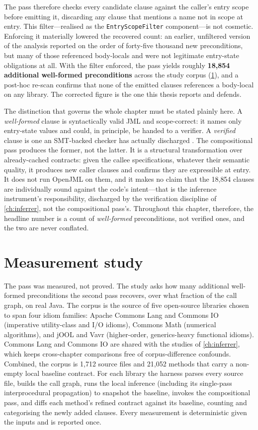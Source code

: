 The pass therefore checks every candidate clause against the caller's entry scope
before emitting it, discarding any clause that mentions a name not in scope at
entry. This filter---realised as the \texttt{EntryScopeFilter} component---is not
cosmetic. Enforcing it materially lowered the recovered count: an earlier,
unfiltered version of the analysis reported on the order of forty-five thousand
new preconditions, but many of those referenced body-locals and were not
legitimate entry-state obligations at all. With the filter enforced, the pass
yields roughly \textbf{18{,}854 additional well-formed preconditions} across the
study corpus (\cref{sec:comp-measurement}), and a post-hoc re-scan confirms that
none of the emitted clauses references a body-local on any library. The corrected
figure is the one this thesis reports and defends.

The distinction that governs the whole chapter must be stated plainly here. A
\emph{well-formed} clause is syntactically valid JML and scope-correct: it names
only entry-state values and could, in principle, be handed to a verifier. A
\emph{verified} clause is one an SMT-backed checker has actually discharged
\citep{cok2014openjml,demoura2008z3}. The compositional pass produces the former,
not the latter. It is a structural transformation over already-cached contracts:
given the callee specifications, whatever their semantic quality, it produces new
caller clauses and confirms they are expressible at entry. It does not run
OpenJML on them, and it makes no claim that the 18{,}854 clauses are individually
sound against the code's intent---that is the inference instrument's
responsibility, discharged by the verification discipline of \cref{ch:inferrer},
not the compositional pass's. Throughout this chapter, therefore, the headline
number is a count of \emph{well-formed} preconditions, not verified ones, and the
two are never conflated.

\section{Measurement study}
\label{sec:comp-measurement}

The pass was measured, not proved. The study asks how many additional well-formed
preconditions the second pass recovers, over what fraction of the call graph, on
real Java. The corpus is the source of five open-source libraries chosen to span
four idiom families: Apache Commons Lang and Commons IO (imperative
utility-class and I/O idioms), Commons Math (numerical algorithms), and jOOL and
Vavr (higher-order, generics-heavy functional idioms). Commons Lang and Commons
IO are shared with the studies of \cref{ch:inferrer}, which keeps cross-chapter
comparisons free of corpus-difference confounds. Combined, the corpus is 1{,}712
source files and 21{,}052 methods that carry a non-empty local baseline contract.
For each library the harness parses every source file, builds the call graph,
runs the local inference (including its single-pass interprocedural propagation)
to snapshot the baseline, invokes the compositional pass, and diffs each method's
refined contract against its baseline, counting and categorising the newly added
clauses. Every measurement is deterministic given the inputs and is reported
once.

